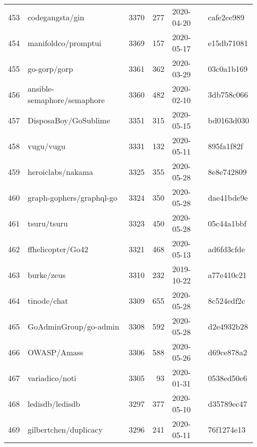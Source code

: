 \begin{footnotesize}
\begin{longtable}{llrrll}
        453 &                                    codegangsta/gin &   3370 &    277 & 2020-04-20 &  cafe2ce989 \\
        454 &                                manifoldco/promptui &   3369 &    157 & 2020-05-17 &  e15db71081 \\
        455 &                                       go-gorp/gorp &   3361 &    362 & 2020-03-29 &  03c0a1b169 \\
        456 &                        ansible-semaphore/semaphore &   3360 &    482 & 2020-02-10 &  3db758c066 \\
        457 &                               DisposaBoy/GoSublime &   3351 &    315 & 2020-05-15 &  bd0163d030 \\
        458 &                                          vugu/vugu &   3331 &    132 & 2020-05-11 &  895fa1f82f \\
        459 &                                  heroiclabs/nakama &   3325 &    355 & 2020-05-28 &  8e8e742809 \\
        460 &                           graph-gophers/graphql-go &   3324 &    350 & 2020-05-28 &  dae41bde9e \\
        461 &                                        tsuru/tsuru &   3323 &    450 & 2020-05-28 &  05c44a1bbf \\
        462 &                                  ffhelicopter/Go42 &   3321 &    468 & 2020-05-13 &  ad6fd3cfde \\
        463 &                                         burke/zeus &   3310 &    232 & 2019-10-22 &  a77e410c21 \\
        464 &                                        tinode/chat &   3309 &    655 & 2020-05-28 &  8c524edf2c \\
        465 &                              GoAdminGroup/go-admin &   3308 &    592 & 2020-05-28 &  d2e4932b28 \\
        466 &                                        OWASP/Amass &   3306 &    588 & 2020-05-26 &  d69ce878a2 \\
        467 &                                     variadico/noti &   3305 &     93 & 2020-01-31 &  0538ed50e6 \\
        468 &                                    ledisdb/ledisdb &   3297 &    377 & 2020-05-10 &  d35789ec47 \\
        469 &                              gilbertchen/duplicacy &   3296 &    241 & 2020-05-11 &  76f1274e13 \\

\end{longtable}
\end{footnotesize}
